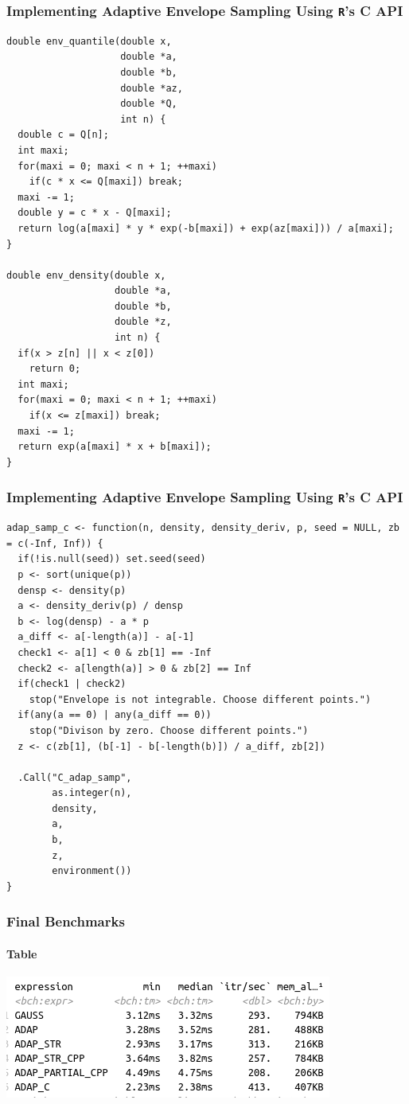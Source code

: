 \documentclass[aspectratio=169]{beamer}
\begin{document}
\begin{frame}[fragile]
  \frametitle{Implementing Adaptive Envelope Sampling Using \texttt{R}'s C API}
\begin{verbatim}
double env_quantile(double x,
                    double *a,
                    double *b,
                    double *az,
                    double *Q,
                    int n) {
  double c = Q[n];
  int maxi;
  for(maxi = 0; maxi < n + 1; ++maxi)
    if(c * x <= Q[maxi]) break;
  maxi -= 1;
  double y = c * x - Q[maxi];
  return log(a[maxi] * y * exp(-b[maxi]) + exp(az[maxi])) / a[maxi];
}

double env_density(double x,
                   double *a,
                   double *b,
                   double *z,
                   int n) {
  if(x > z[n] || x < z[0])
    return 0;
  int maxi;
  for(maxi = 0; maxi < n + 1; ++maxi)
    if(x <= z[maxi]) break;
  maxi -= 1;
  return exp(a[maxi] * x + b[maxi]);
}
\end{verbatim}
\end{frame}
\begin{frame}[fragile]
  \frametitle{Implementing Adaptive Envelope Sampling Using \texttt{R}'s C API}
\begin{verbatim}
adap_samp_c <- function(n, density, density_deriv, p, seed = NULL, zb = c(-Inf, Inf)) {
  if(!is.null(seed)) set.seed(seed)
  p <- sort(unique(p))
  densp <- density(p)
  a <- density_deriv(p) / densp
  b <- log(densp) - a * p
  a_diff <- a[-length(a)] - a[-1]
  check1 <- a[1] < 0 & zb[1] == -Inf
  check2 <- a[length(a)] > 0 & zb[2] == Inf
  if(check1 | check2)
    stop("Envelope is not integrable. Choose different points.")
  if(any(a == 0) | any(a_diff == 0))
    stop("Divison by zero. Choose different points.")
  z <- c(zb[1], (b[-1] - b[-length(b)]) / a_diff, zb[2])
  
  .Call("C_adap_samp",
        as.integer(n),
        density,
        a,
        b,
        z,
        environment())
}
\end{verbatim}
\end{frame}
\begin{frame}
  \frametitle{Final Benchmarks}
  \framesubtitle{Table}
  \centering
  \includegraphics[scale = 0.5]{figure/C_TABLE.png}
\end{frame}
\end{document}
